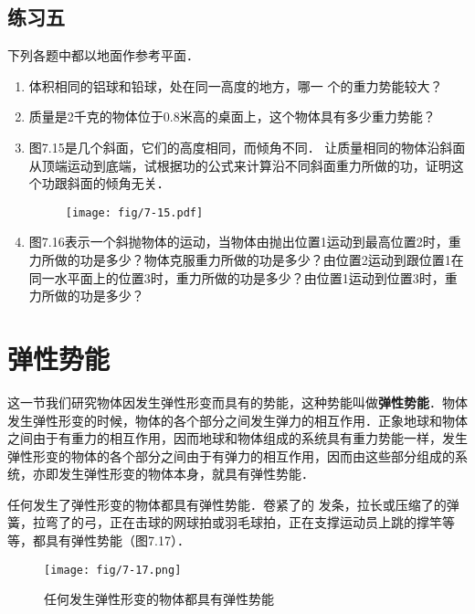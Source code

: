 \subsection*{练习五}
下列各题中都以地面作参考平面．
\begin{enumerate}
    \item 体积相同的铝球和铅球，处在同一高度的地方，哪一
    个的重力势能较大？
    \item 质量是2千克的物体位于0.8米高的桌面上，这个物体具有多少重力势能？
    \item 图7.15是几个斜面，它们的高度相同，而倾角不同．
    让质量相同的物体沿斜面从顶端运动到底端，试根据功的公式来计算沿不同斜面重力所做的功，证明这个功跟斜面的倾角无关．
\begin{figure}[htp]
\centering\texttt{[image: fig/7-15.pdf]}
\caption{}
\end{figure}
\item 图7.16表示一个斜抛物体的运动，当物体由抛出位置1运动到最高位置2时，重力所做的功是多少？物体克服重力所做的功是多少？由位置2运动到跟位置1在同一水平面上的位置3时，重力所做的功是多少？由位置1运动到位置3时，重力所做的功是多少？
\end{enumerate}

\begin{figure}[htp]\centering
{}
\caption{}
\end{figure}


\section{弹性势能}
这一节我们研究物体因发生弹性形变而具有的势能，这种势能叫做\textbf{弹性势能}．物体发生弹性形变的时候，物体的各个部分之间发生弹力的相互作用．正象地球和物体之间由于有重力的相互作用，因而地球和物体组成的系统具有重力势能一样，发生弹性形变的物体的各个部分之间由于有弹力的相互作用，因而由这些部分组成的系统，亦即发生弹性形变的物体本身，就具有弹性势能．

任何发生了弹性形变的物体都具有弹性势能．卷紧了的
发条，拉长或压缩了的弹簧，拉弯了的弓，正在击球的网球拍或羽毛球拍，正在支撑运动员上跳的撑竿等等，都具有弹性势能（图7.17）．
\begin{figure}[htp]
\centering\texttt{[image: fig/7-17.png]}
\caption{任何发生弹性形变的物体都具有弹性势能}
\end{figure}


